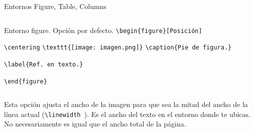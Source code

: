 \documentclass[aspectratio=169, 10pt]{beamer}
\begin{document}
\begin{frame}[fragile]{Entornos Figure, Table, Columns}
    \begin{columns}

    \begin{column}{.68\linewidth}        
    \begin{block}{Entorno figure. Opción por defecto.}
        \verb|\begin{figure}[Posición]|
        
                \verb|\centering|
                   \verb|\texttt{[image: imagen.png]}|
                \verb|\caption{Pie de figura.}|
                
                \verb|\label{Ref. en texto.}|
                
        \verb|\end{figure}|

    \end{block}    
    \end{column}


    \end{columns}

\vspace{0.5cm}
Esta opción ajusta el ancho de la imagen para que sea la mitad del ancho de la línea actual (\verb|\linewidth |). Es el ancho del texto en el entorno donde te ubicas. No necesariamente es igual que el ancho total de la página.
    
\end{frame}
\end{document}
